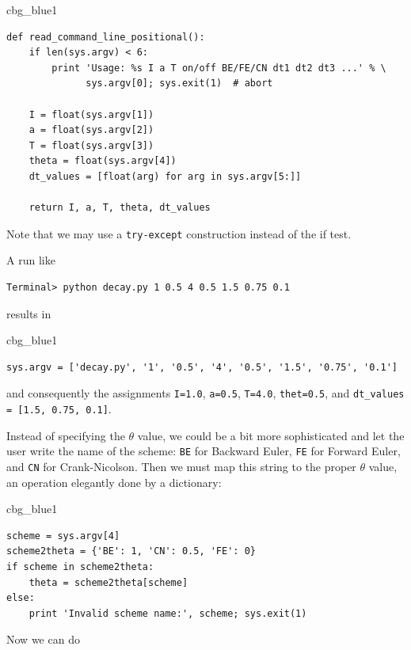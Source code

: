 \documentclass[%
oneside,                 %
final,                   %
10pt]{article}
\newenvironment{_cod_tight}[1]{
   \def\FrameCommand{\colorbox{#1}}
   \FrameRule0.6pt\MakeFramed {\FrameRestore}\vskip3mm}
   {\vskip0mm\endMakeFramed}
\newenvironment{cod}[1]{
\bgroup\rmfamily
\fboxsep=0mm\relax
\begin{_cod_tight}{#1}
\list{}{\parsep=-2mm\parskip=0mm\topsep=0pt\leftmargin=2mm
\rightmargin=2\leftmargin\leftmargin=4pt\relax}
\item\relax}
{\endlist\end{_cod_tight}\egroup}
\begin{document}
\begin{cod}{cbg_blue1}\begin{Verbatim}[numbers=none,fontsize=\fontsize{9pt}{9pt},baselinestretch=0.95,xleftmargin=2mm]
def read_command_line_positional():
    if len(sys.argv) < 6:
        print 'Usage: %s I a T on/off BE/FE/CN dt1 dt2 dt3 ...' % \ 
              sys.argv[0]; sys.exit(1)  # abort

    I = float(sys.argv[1])
    a = float(sys.argv[2])
    T = float(sys.argv[3])
    theta = float(sys.argv[4])
    dt_values = [float(arg) for arg in sys.argv[5:]]

    return I, a, T, theta, dt_values
\end{Verbatim}
\end{cod}
\noindent
Note that we may use a \texttt{try-except} construction instead of the if test.

A run like

\begin{Verbatim}[frame=lines,label=\fbox{{\tiny Terminal}},framesep=2.5mm,framerule=0.7pt,fontsize=\fontsize{9pt}{9pt}]
Terminal> python decay.py 1 0.5 4 0.5 1.5 0.75 0.1
\end{Verbatim}
results in

\begin{cod}{cbg_blue1}\begin{Verbatim}[numbers=none,fontsize=\fontsize{9pt}{9pt},baselinestretch=0.95,xleftmargin=2mm]
sys.argv = ['decay.py', '1', '0.5', '4', '0.5', '1.5', '0.75', '0.1']
\end{Verbatim}
\end{cod}
\noindent
and consequently the assignments \texttt{I=1.0}, \texttt{a=0.5}, \texttt{T=4.0}, \texttt{thet=0.5},
and \Verb!dt_values = [1.5, 0.75, 0.1]!.

Instead of specifying the $\theta$ value, we could be a bit more
sophisticated and let the user write the name of the scheme:
\texttt{BE} for Backward Euler, \texttt{FE} for Forward Euler, and \texttt{CN}
for Crank-Nicolson. Then we must map this string to the proper
$\theta$ value, an operation elegantly done by a dictionary:

\begin{cod}{cbg_blue1}\begin{Verbatim}[numbers=none,fontsize=\fontsize{9pt}{9pt},baselinestretch=0.95,xleftmargin=2mm]
scheme = sys.argv[4]
scheme2theta = {'BE': 1, 'CN': 0.5, 'FE': 0}
if scheme in scheme2theta:
    theta = scheme2theta[scheme]
else:
    print 'Invalid scheme name:', scheme; sys.exit(1)
\end{Verbatim}
\end{cod}
\noindent
Now we can do
\end{document}
